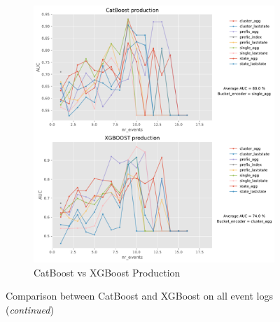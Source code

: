 \begin{figure}[!htb]
	\begin{subfigure}{0.48\textwidth}
		\includegraphics[width=\linewidth]{images/catboost/graphs/production_CatBoost_xgboost.pdf}
		\caption{CatBoost vs XGBoost Production} \label{fig:pro}
	\end{subfigure}\hspace*{\fill}
	\caption{Comparison between CatBoost and XGBoost on all event logs (\textit{continued})}
\label{fig:r3}
\end{figure}



